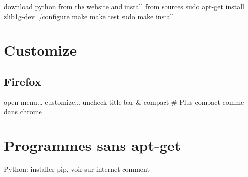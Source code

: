 \documentclass{article}
\begin{document}
download python from the website and install from sources
sudo apt-get install zlib1g-dev
./configure
make
make test
sudo make install

\section{Customize}

\subsection{Firefox}
  open menu... customize... uncheck title bar & compact # Plus compact comme dans chrome

\section{Programmes sans apt-get}

Python: installer pip, voir sur internet comment
\end{document}
